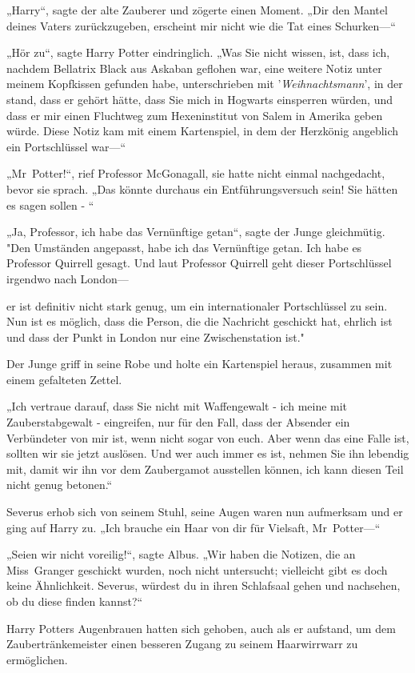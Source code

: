 {„Harry“, sagte der alte Zauberer und zögerte einen Moment. „Dir den Mantel deines Vaters zurückzugeben, erscheint mir nicht wie die Tat eines Schurken—“

„Hör zu“, sagte Harry Potter eindringlich. „Was Sie nicht wissen, ist, dass ich, nachdem Bellatrix Black aus Askaban geflohen war, eine weitere Notiz unter meinem Kopfkissen gefunden habe, unterschrieben mit '\emph{Weihnachtsmann}', in der stand, dass er gehört hätte, dass Sie mich in Hogwarts einsperren würden, und dass er mir einen Fluchtweg zum Hexeninstitut von Salem in Amerika geben würde. Diese Notiz kam mit einem Kartenspiel, in dem der Herzkönig angeblich ein Portschlüssel war—“

„Mr~Potter!“, rief Professor McGonagall, sie hatte nicht einmal nachgedacht, bevor sie sprach. „Das könnte durchaus ein Entführungsversuch sein! Sie hätten es sagen sollen - “

„Ja, Professor, ich habe das Vernünftige getan“, sagte der Junge gleichmütig. "Den Umständen angepasst, habe ich das Vernünftige getan. Ich habe es Professor Quirrell gesagt. Und laut Professor Quirrell geht dieser Portschlüssel irgendwo nach London—

er ist definitiv nicht stark genug, um ein internationaler Portschlüssel zu sein. Nun ist es möglich, dass die Person, die die Nachricht geschickt hat, ehrlich ist und dass der Punkt in London nur eine Zwischenstation ist."

Der Junge griff in seine Robe und holte ein Kartenspiel heraus, zusammen mit einem gefalteten Zettel.

„Ich vertraue darauf, dass Sie nicht mit Waffengewalt - ich meine mit Zauberstabgewalt - eingreifen, nur für den Fall, dass der Absender ein Verbündeter von mir ist, wenn nicht sogar von euch. Aber wenn das eine Falle ist, sollten wir sie jetzt auslösen. Und wer auch immer es ist, nehmen Sie ihn lebendig mit, damit wir ihn vor dem Zaubergamot ausstellen können, ich kann diesen Teil nicht genug betonen.“

Severus erhob sich von seinem Stuhl, seine Augen waren nun aufmerksam und er ging auf Harry zu. „Ich brauche ein Haar von dir für Vielsaft, Mr~Potter—“

„Seien wir nicht voreilig!“, sagte Albus. „Wir haben die Notizen, die an Miss~Granger geschickt wurden, noch nicht untersucht; vielleicht gibt es doch keine Ähnlichkeit. Severus, würdest du in ihren Schlafsaal gehen und nachsehen, ob du diese finden kannst?“

Harry Potters Augenbrauen hatten sich gehoben, auch als er aufstand, um dem Zaubertränkemeister einen besseren Zugang zu seinem Haarwirrwarr zu ermöglichen.

}

